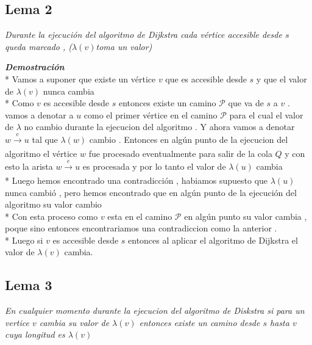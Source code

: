 \documentclass[10pt]{article}
\begin{document}
    \subsection*{Lema 2} 
        \noindent \textit{Durante la ejecuci\'on del algoritmo de Dijkstra cada v\'ertice accesible desde $s$ queda marcado , ($\lambda (v)$toma un valor) }
        
        \vspace{0.5cm}
        \noindent \textit{\textbf{Demostraci\'on}}
        \\*
        Vamos a suponer que existe un v\'ertice $v$ que es accesible desde $s$
        y que el valor de $\lambda\left(v\right)$ nunca cambia 
        \\*
        Como $v$ es accesible desde $s$ entonces existe un camino $\mathcal{P} $
        que va de $s$ a $v$ . vamos a denotar a $u$ como el primer v\'ertice en 
        el camino $\mathcal{P}$ para el cual el valor de $\lambda$ no cambio
        durante la ejecucion del algoritmo . Y ahora vamos a denotar $w \xrightarrow[]{e} u$ 
        tal que  $\lambda\left(w\right)$ cambio . Entonces en alg\'un punto de la 
        ejecucion del algoritmo el v\'ertice $w$ fue procesado eventualmente para
        salir de la cola $Q$ y con esto la arista $w \xrightarrow[]{e} u$  es procesada y por
        lo tanto el valor de $\lambda\left(u\right)$ cambia 
        \\*
        Luego hemos encontrado una contradicci\'on , habiamos supuesto que 
        $\lambda\left(u\right)$ nunca cambi\'o , pero hemos encontrado que en alg\'un 
        punto de la ejecuci\'on del algoritmo su valor cambio 
        \\*
        Con esta proceso como $v$ esta en el camino $\mathcal{P}$ en alg\'un punto 
        su valor cambia , poque sino entonces encontrariamos una contradiccion como 
        la anterior . 
        \\*
        Luego si $v$ es accesible desde $s$ entonces al aplicar el algoritmo de Dijkstra
        el valor de $\lambda\left(v\right)$ cambia.
        
    \subsection*{Lema 3}

        \noindent \textit{En cualquier momento durante la ejecucion del algoritmo de Diskstra si 
        para un vertice $v $ cambia  su valor de $\lambda\left(v\right)$ entonces existe 
        un camino desde $s$ hasta $v$ cuya longitud es $\lambda\left(v\right)$}
\end{document}
